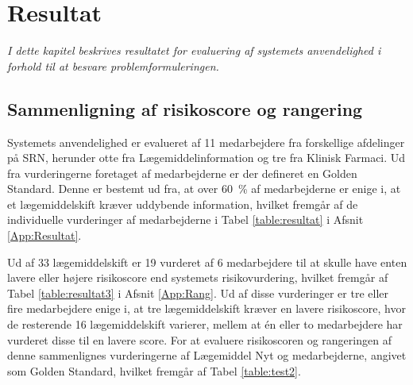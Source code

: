 \chapter{Resultat}
\vspace{-0.3cm}
\textit{I dette kapitel beskrives resultatet for evaluering af systemets anvendelighed i forhold til at besvare problemformuleringen.}

\section{Sammenligning af risikoscore og rangering}
Systemets anvendelighed er evalueret af 11 medarbejdere fra forskellige afdelinger på SRN, herunder otte fra Lægemiddelinformation og tre fra Klinisk Farmaci. Ud fra vurderingerne foretaget af medarbejderne er der defineret en Golden Standard. Denne er bestemt ud fra, at over 60~\% af medarbejderne er enige i, at et lægemiddelskift kræver uddybende information, hvilket fremgår af de individuelle vurderinger af medarbejderne i Tabel \ref{table:resultat} i Afsnit \ref{App:Resultat}.

Ud af 33 lægemiddelskift er 19 vurderet af 6 medarbejdere til at skulle have enten lavere eller højere risikoscore end systemets risikovurdering, hvilket fremgår af Tabel \ref{table:resultat3} i Afsnit \ref{App:Rang}. Ud af disse vurderinger er tre eller fire medarbejdere enige i, at tre lægemiddelskift kræver en lavere risikoscore, hvor de resterende 16 lægemiddelskift varierer, mellem at én eller to medarbejdere har vurderet disse til en lavere score. %
For at evaluere risikoscoren og rangeringen af denne sammenlignes vurderingerne af Lægemiddel Nyt og medarbejderne, angivet som Golden Standard, hvilket fremgår af Tabel \ref{table:test2}. 

